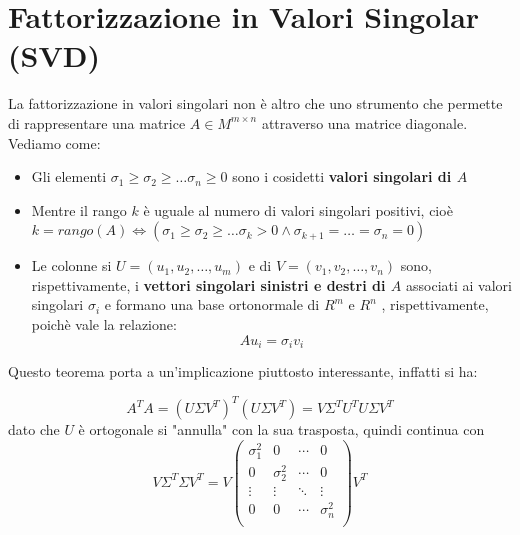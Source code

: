 \section{Fattorizzazione in Valori Singolar (SVD)}
La fattorizzazione in valori singolari non è altro che uno strumento che permette di rappresentare una matrice $A\in M^{m\times n}$ attraverso una matrice diagonale. Vediamo come:
\begin{itemize}
    \item Gli elementi $\sigma_1\geq\sigma_2\geq\dots\sigma_n\geq 0$ sono i cosidetti  \textbf{valori singolari di $A$}
    \item Mentre il rango $k$ è uguale al numero di valori singolari positivi, cioè $k=rango(A)\iff (\sigma_1\geq\sigma_2\geq\dots\sigma_k > 0\land \sigma_{k+1}=\dots = \sigma_n = 0)$
    \item Le colonne si $U=(u_1,u_2,\dots, u_m)$ e di $V=(v_1,v_2,\dots,v_n)$ sono, rispettivamente, i \textbf{vettori singolari sinistri e destri di $A$} associati ai valori singolari $\sigma_i$ e formano una base ortonormale di $R^m$ e $R^n$ , rispettivamente, poichè vale la relazione:
    \[
            Au_i = \sigma_i v_i
    \]
\end{itemize}


Questo teorema porta a un'implicazione piuttosto interessante, inffatti si ha: 

\[
    A^T A = (U\Sigma V^T)^T (U\Sigma V^T) = V\Sigma^T U^T U\Sigma V^T
\]
dato che $U$ è ortogonale si "annulla" con la sua trasposta, quindi continua con 
\[
    V\Sigma^T \Sigma V^T = V 
    \begin{pmatrix}
        \sigma_1^2 & 0 & \cdots & 0 \\
        0 & \sigma_2^2 & \cdots & 0 \\
        \vdots & \vdots & \ddots & \vdots \\
        0 & 0 & \cdots & \sigma_n^2 \\
    \end{pmatrix} V^T
\]

